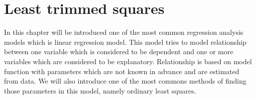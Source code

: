 

% 

\chapter{Least trimmed squares}
In this chapter will be introduced one of the most common regression analysis models which is linear regression model. This model tries to model relationship between one variable which is considered to be dependent and one or more variables which are considered to be explanatory. Relationship is based on model function with parameters which are not known in advance and are estimated from data. We will also introduce one of the most commons methods of finding those parameters in this model, namely ordinary least squares.
